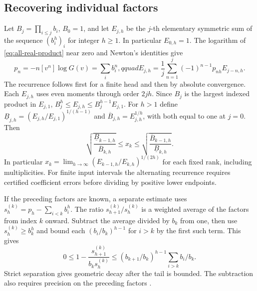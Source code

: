 \subsection{Recovering individual factors}

Let \(B_j=\prod_{i\le j} b_i\), \(B_0=1\), and let \(E_{j,h}\) be
the \(j\)-th elementary symmetric sum of the sequence \((b_i^h)_i\)
for integer \(h\ge1\). In particular \(E_{0,h}=1\). The logarithm
of \eqref{eq:all-real-product} near zero and Newton's identities give
\[
 p_n=-n[v^n]\log G(v)=\sum_i b_i^n,qquad
 E_{j,h}=\frac1j\sum_{n=1}^j(-1)^{n-1}p_{nh} E_{j-n,h} .
\]
The recurrence follows first for a finite head and then by absolute
convergence. Each \(E_{j,h}\) uses even moments through order \(2jh\).
Since \(B_j\) is the largest indexed product in \(E_{j,1}\),
\(B_j^h\le E_{j,h}\le B_j^{h-1}E_{j,1}\).
For \(h>1\) define
\(\underline B_{j,h}=(E_{j,h}/E_{j,1})^{1/(h-1)}\) and
\(\overline B_{j,h}=E_{j,h}^{1/h}\), with both equal to one at \(j=0\).
Then
\begin{equation}\label{eq:factor-interval}
 \sqrt{\frac{\underline B_{k-1,h}}{\overline B_{k,h}}}
 \le x_k\le
 \sqrt{\frac{\overline B_{k-1,h}}{\underline B_{k,h}}}.
\end{equation}
In particular \(x_k=\lim_{h\to\infty}(E_{k-1,h}/E_{k,h})^{1/(2h)}\)
for each fixed rank, including multiplicities. For finite input
intervals the alternating recurrence requires certified coefficient
errors before dividing by positive lower endpoints.

If the preceding factors are known, a separate estimate uses
\(s_h^{(k)}=p_h-\sum_{i<k}b_i^h\). The ratio
\(s_{h+1}^{(k)}/s_h^{(k)}\) is a weighted average of the factors
from index \(k\) onward. Subtract the average divided by \(b_k\)
from one, then use \(s_h^{(k)}\ge b_k^h\) and bound each
\((b_i/b_k)^{h-1}\) for \(i>k\) by the first such term. This gives
\[
 0\le 1-\frac{s_{h+1}^{(k)}}{b_k s_h^{(k)}}
 \le (b_{k+1}/b_k)^{h-1}\sum_{i>k} b_i/b_k .
\]
Strict separation gives geometric decay after the tail is bounded.
The subtraction also requires precision on the preceding factors
\cite[\S3]{Founding07}.

